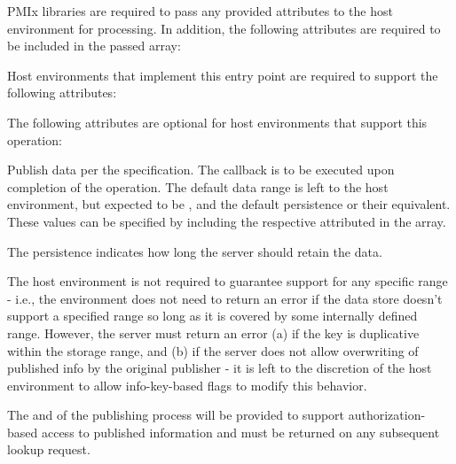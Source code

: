 \reqattrstart
\ac{PMIx} libraries are required to pass any provided attributes to the host environment for processing. In addition, the following attributes are required to be included in the passed  array:


Host environments that implement this entry point are required to support the following attributes:


\reqattrend

\optattrstart
The following attributes are optional for host environments that support this operation:


\optattrend

\descr

Publish data per the  specification.
The callback is to be executed upon completion of the operation.
The default data range is left to the host environment, but expected to be , and the default persistence  or their equivalent.
These values can be specified by including the respective attributed in the  array.

The persistence indicates how long the server should retain the data.

\advicermstart
The host environment is not required to guarantee support for any specific range - i.e., the environment does not need to return an error if the data store doesn't support a specified range so long as it is covered by some internally defined range.
However, the server must return an error (a) if the key is duplicative within the storage range, and (b) if the server does not allow overwriting of published info by the original publisher - it is left to the discretion of the host environment to allow info-key-based flags to modify this behavior.

The  and  of the publishing process will be provided to support authorization-based access to published information and must be returned on any subsequent lookup request.
\advicermend

\subsection{}

